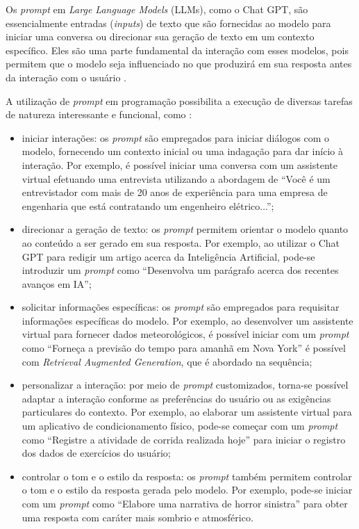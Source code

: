 \documentclass[10pt, conference, compsocconf]{IEEEtran}
\begin{document}
Os \textit{prompt} em \textit{Large Language Models} (LLMs), como o Chat GPT, são essencialmente entradas (\textit{inputs}) de texto que são fornecidas ao modelo para iniciar uma conversa ou direcionar sua geração de texto em um contexto específico. Eles são uma parte fundamental da interação com esses modelos, pois permitem que o modelo seja influenciado no que produzirá em sua resposta antes da interação com o usuário \cite{NEURIPS2020_1457c0d6}.

A utilização de \textit{prompt} em programação possibilita a execução de diversas tarefas de natureza interessante e funcional, como \cite{radford2019language}:
\begin{itemize}

    \item iniciar interações: os \textit{prompt} são empregados para iniciar diálogos com o modelo, fornecendo um contexto inicial ou uma indagação para dar início à interação. Por exemplo, é possível iniciar uma conversa com um assistente virtual efetuando uma entrevista utilizando a abordagem de ``Você é um entrevistador com mais de 20 anos de experiência para uma empresa de engenharia que está contratando um engenheiro elétrico...'';
    \item direcionar a geração de texto: os  \textit{prompt} permitem orientar o modelo quanto ao conteúdo a ser gerado em sua resposta. Por exemplo, ao utilizar o Chat GPT para redigir um artigo acerca da Inteligência Artificial, pode-se introduzir um  \textit{prompt} como ``Desenvolva um parágrafo acerca dos recentes avanços em IA'';
    \item solicitar informações específicas: os  \textit{prompt} são empregados para requisitar informações específicas do modelo. Por exemplo, ao desenvolver um assistente virtual para fornecer dados meteorológicos, é possível iniciar com um  \textit{prompt} como ``Forneça a previsão do tempo para amanhã em Nova York'' é possível com \textit{Retrieval Augmented Generation}, que é abordado na sequência;
    \item personalizar a interação: por meio de  \textit{prompt} customizados, torna-se possível adaptar a interação conforme as preferências do usuário ou as exigências particulares do contexto. Por exemplo, ao elaborar um assistente virtual para um aplicativo de condicionamento físico, pode-se começar com um  \textit{prompt} como ``Registre a atividade de corrida realizada hoje'' para iniciar o registro dos dados de exercícios do usuário;
    \item controlar o tom e o estilo da resposta: os  \textit{prompt} também permitem controlar o tom e o estilo da resposta gerada pelo modelo. Por exemplo, pode-se iniciar com um \textit{prompt} como ``Elabore uma narrativa de horror sinistra'' para obter uma resposta com caráter mais sombrio e atmosférico.
    
\end{itemize}
\end{document}
